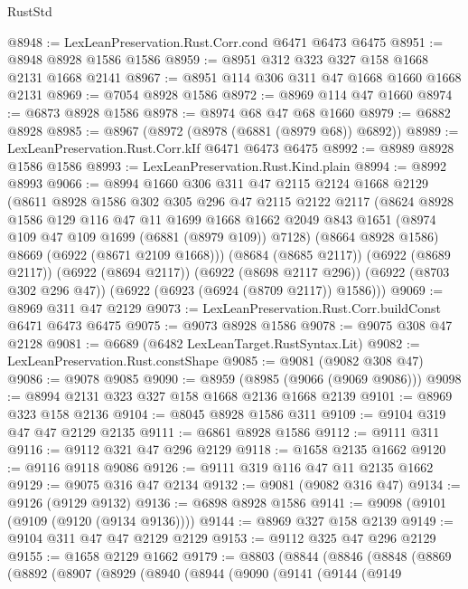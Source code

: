 \begin{lexlean}{RustStd}
\begin{coremodule}
@8948 := LexLeanPreservation.Rust.Corr.cond @6471 @6473 @6475
@8951 := @8948 @8928 @1586 @1586
@8959 := @8951 @312 @323 @327 @158 @1668 @2131 @1668 @2141
@8967 := @8951 @114 @306 @311 @47 @1668 @1660 @1668 @2131
@8969 := @7054 @8928 @1586
@8972 := @8969 @114 @47 @1660
@8974 := @6873 @8928 @1586
@8978 := @8974 @68 @47 @68 @1660
@8979 := @6882 @8928
@8985 := @8967 (@8972 (@8978 (@6881 (@8979 @68)) @6892))
@8989 := LexLeanPreservation.Rust.Corr.kIf @6471 @6473 @6475
@8992 := @8989 @8928 @1586 @1586
@8993 := LexLeanPreservation.Rust.Kind.plain
@8994 := @8992 @8993
@9066 := @8994
    @1660
    @306
    @311
    @47
    @2115
    @2124
    @1668
    @2129
    (@8611
      @8928
      @1586
      @302
      @305
      @296
      @47
      @2115
      @2122
      @2117
      (@8624
        @8928
        @1586
        @129
        @116
        @47
        @11
        @1699
        @1668
        @1662
        @2049
        @843
        @1651
        (@8974 @109 @47 @109 @1699 (@6881 (@8979 @109)) @7128)
        (@8664 @8928 @1586)
        @8669
        (@6922 (@8671 @2109 @1668)))
      (@8684 (@8685 @2117))
      (@6922 (@8689 @2117))
      (@6922 (@8694 @2117))
      (@6922 (@8698 @2117 @296))
      (@6922 (@8703 @302 @296 @47))
      (@6922 (@6923 (@6924 (@8709 @2117)) @1586)))
@9069 := @8969 @311 @47 @2129
@9073 := LexLeanPreservation.Rust.Corr.buildConst @6471 @6473 @6475
@9075 := @9073 @8928 @1586
@9078 := @9075 @308 @47 @2128
@9081 := @6689 (@6482 LexLeanTarget.RustSyntax.Lit)
@9082 := LexLeanPreservation.Rust.constShape
@9085 := @9081 (@9082 @308 @47)
@9086 := @9078 @9085
@9090 := @8959 (@8985 (@9066 (@9069 @9086)))
@9098 := @8994 @2131 @323 @327 @158 @1668 @2136 @1668 @2139
@9101 := @8969 @323 @158 @2136
@9104 := @8045 @8928 @1586 @311
@9109 := @9104 @319 @47 @47 @2129 @2135
@9111 := @6861 @8928 @1586
@9112 := @9111 @311
@9116 := @9112 @321 @47 @296 @2129
@9118 := @1658 @2135 @1662
@9120 := @9116 @9118 @9086
@9126 := @9111 @319 @116 @47 @11 @2135 @1662
@9129 := @9075 @316 @47 @2134
@9132 := @9081 (@9082 @316 @47)
@9134 := @9126 (@9129 @9132)
@9136 := @6898 @8928 @1586
@9141 := @9098 (@9101 (@9109 (@9120 (@9134 @9136))))
@9144 := @8969 @327 @158 @2139
@9149 := @9104 @311 @47 @47 @2129 @2129
@9153 := @9112 @325 @47 @296 @2129
@9155 := @1658 @2129 @1662
@9179 := @8803
    (@8844
      (@8846
        (@8848
          (@8869
            (@8892
              (@8907
                (@8929
                  (@8940
                    (@8944
                      (@9090
                        (@9141
                          (@9144
                            (@9149

\end{coremodule}
\end{lexlean}

